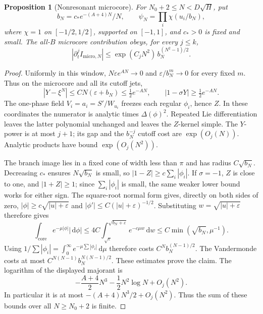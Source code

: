 \documentclass[11pt]{article}
\numberwithin{equation}{section}
\newtheorem{proposition}[theorem]{Proposition}
\theoremstyle{definition}
\newcommand{\dd}{\,\mathrm d}
\newcommand{\eps}{\varepsilon}
\begin{document}
\begin{proposition}[Nonresonant microcore]\label{prop:micro}
For \(N_0+2\le N<D\sqrt H\), put
\[
 b_N=c_*e^{-(A+4)N}/N,\qquad
 \psi_N=\prod_i\chi(u_i/b_N),
\]
where \(\chi=1\) on \([-1/2,1/2]\), supported on \([-1,1]\), and
\(c_*>0\) is fixed and small. The all-\(B\) microcore contribution
obeys, for every \(j\le k\),
\[
 |\partial_t^j I_{\mathrm{micro},N}|
 \le \exp(C_jN^2)\,b_N^{(N^2-1)/2}.
\]
\end{proposition}
\begin{proof}
Uniformly in this window,
\(N\eps e^{AN}\to0\) and \(\eps/b_N^m\to0\) for every fixed \(m\).
Thus on the microcore and all its cutoff jets,
\[
 |Y-\xi^N|\le CN(\eps+b_N)\le\tfrac12e^{-AN},
 \qquad |1-\sigma Y|\ge\tfrac12e^{-AN}.
\]
The one-phase field \(V_i=a_i=S'/W_{u_i}\) freezes each regular
\(\phi_i\), hence \(Z\). In these coordinates the numerator is
analytic times \(\Delta(\phi)^2\).
Repeated Lie differentiation leaves the latter polynomial unchanged
and leaves the \(Z\)-kernel simple. The \(Y\)-power is at most
\(j+1\); its gap and the \(b_N^{-j}\) cutoff cost are
\(\exp(O_j(N))\). Analytic products have bound \(\exp(O_j(N^2))\).

The branch image lies in a fixed cone of width less than \(\pi\)
and has radius \(C\sqrt{b_N}\). Decreasing \(c_*\) ensures
\(N\sqrt{b_N}\) is small, so $|1-Z|\ge c\sum_i|\phi_i|$. If $\sigma=-1$,
$Z$ is close to one, and $|1+Z|\ge1$; since $\sum_i|\phi_i|$
is small, the same weaker lower bound works for either sign.
The square-root normal form gives, directly on both sides of zero,
\(|\phi|\ge c\sqrt{|u|+\eps}\) and
\(|\phi'|\le C(|u|+\eps)^{-1/2}\). Substituting
\(w=\sqrt{|u|+\eps}\) therefore gives
\[
 \int_{\mathrm{core}}e^{-\mu|\phi|}|\dd\phi|
       \le4C\int_{\sqrt\eps}^{\sqrt{b_N+\eps}}e^{-c\mu w}\dd w
       \le C\min(\sqrt{b_N},\mu^{-1}).
\]
Using \(1/\sum|\phi_i|=\int_0^\infty e^{-\mu\sum|\phi_i|}\dd \mu\)
therefore costs \(C^N b_N^{(N-1)/2}\).
The Vandermonde costs at most
\(C^{N(N-1)}b_N^{N(N-1)/2}\). These estimates prove the claim.
The logarithm of the displayed majorant is
\[
 -\frac{A+4}{2}N^3-\frac12N^2\log N+O_j(N^2).
\]
In particular it is at most \(-(A+4)N^3/2+O_j(N^2)\).
Thus the sum of these bounds over all \(N\ge N_0+2\) is finite.
\end{proof}
\end{document}
